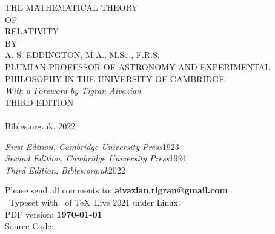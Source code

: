 \documentclass[12pt]{book}
\begin{document}
\MainMatter

\thispagestyle{empty}
\vspace*{1ex}
\begin{center}
\parttitlefont
\LARGE THE MATHEMATICAL THEORY\\
\medskip
\large OF\\
\medskip
\LARGE RELATIVITY\\
\bigskip
\titlefont
\normalsize BY \\
\Large A. S. EDDINGTON, M.A., \textsc{M.Sc.}, F.R.S.\\
\medskip
\scriptsize PLUMIAN PROFESSOR OF ASTRONOMY AND EXPERIMENTAL\\
PHILOSOPHY IN THE UNIVERSITY OF CAMBRIDGE\\
{\normalsize\itshape With a Foreword by Tigran Aivazian}\\
\small THIRD EDITION\\
\titlesepbig\\[2ex]
\Large Bibles.org.uk, 2022\\
\end{center}
\newpage\thispagestyle{empty}
\hfill
\parbox{8.5cm}{%
\begin{center}
\textit{First Edition, Cambridge University Press}\hfill1923\\
\medskip
\textit{Second Edition, Cambridge University Press}\hfill1924\\
\medskip
\textit{Third Edition, Bibles.org.uk}\hfill2022\\
\end{center}
}
\hfill
{}
\begin{center}
Please send all comments to: {\makeatletter\upshape\bfseries aivazian.tigran@gmail.com\makeatother}\\[1ex]
\tux\ Typeset with \XeLaTeX\ of \TeX\ Live 2021 under Linux.\\
PDF version: \textbf{\today{}}\\
Source Code: 
\end{center}

\TableofContents

\end{document}

